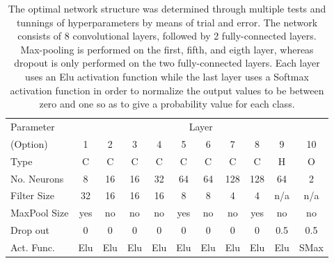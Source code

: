 \documentclass[%
 amsmath,amssymb,
 aps,
 twocolumn,
 prl,
 reprint,
floatfix,
]{revtex4-1}
\begin{document}
\begin{table}[]
\begin{tabular}{lcccccccccc}
\hline
\hline
Parameter & \multicolumn{10}{c}{Layer}\\
\cline{2-11}
(Option) & 1 & 2 & 3 & 4 & 5 & 6 & 7 & 8 & 9 & 10 \\
\hline
Type & C & C & C & C & C & C & C & C & H & O \\
No. Neurons  & 8  & 16  & 16 & 32 & 64 & 64 & 128 & 128 & 64  & 2  \\
Filter Size  & 32 & 16  & 16 & 16 & 8  & 8  & 4   & 4   & n/a & n/a \\
MaxPool Size & yes & no & no & no & yes & no & no & yes & no & no \\
Drop out  & 0 & 0 & 0 & 0 & 0 & 0 & 0 & 0 & 0.5 & 0.5 \\
Act. Func. & Elu & Elu & Elu & Elu & Elu & Elu & Elu & Elu & Elu & SMax \\
\hline
\end{tabular}
\caption{The optimal network structure was determined through
multiple tests and tunnings of hyperparameters by means of trial and error. The
network consists of 8 convolutional layers, followed by 2 fully-connected
layers. Max-pooling is performed on the first, fifth, and eigth layer, whereas
dropout is only performed on the two fully-connected layers. Each layer uses an
Elu activation function while the last layer uses a Softmax activation function
in order to normalize the output values to be between zero and one so as to
give a probability value for each class.\label{table:network}}
\end{table}
\end{document}
